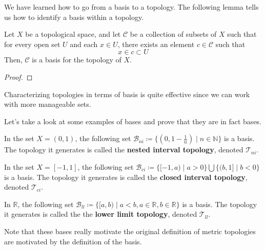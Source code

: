     We have learned how to go from a basis to a topology. The following lemma tells us how to identify a basis within a topology. 

    \begin{theorem}
      Let $X$ be a topological space, and let $\mathcal{C}$ be a collection of subsets of $X$ such that for every open set $U$ and each $x \in U$, there exists an element $c \in \mathcal{C}$ such that
      \begin{equation}
        x \in c \subset U
      \end{equation}
      Then, $\mathcal{C}$ is a basis for the topology of $X$. 
    \end{theorem}
    \begin{proof}
      
    \end{proof} 

    Characterizing topologies in terms of basis is quite effective since we can work with more manageable sets. 

    Let's take a look at some examples of bases and prove that they are in fact bases. 

    \begin{theorem}
      In the set $X = (0,1)$, the following set $\mathscr{B}_{ni} \coloneqq \{ (0, 1-\frac{1}{n}) \; | \; n \in \mathbb{N} \}$ is a basis. The topology it generates is called the \textbf{nested interval topology}, denoted $\mathscr{T}_{ni}$. 
    \end{theorem}

    \begin{theorem}[Closed Interval Topology on $[-1, 1\rbrack$]
      In the set $X = [-1, 1]$, the following set $\mathscr{B}_{ci} \coloneqq \{ [-1, a) \; | \; a>0 \big\} \bigcup \big\{ (b, 1] \; | \; b<0 \}$ is a basis. The topology it generates is called the \textbf{closed interval topology}, denoted $\mathscr{T}_{ci}$. 
    \end{theorem}

    \begin{theorem} 
      In $\mathbb{R}$, the following set $\mathscr{B}_{ll} \coloneqq \{ [a, b) \mid a < b, a \in \mathbb{R}, b \in \mathbb{R} \}$ is a basis. The topology it generates is called the the \textbf{lower limit topology}, denoted $\mathscr{T}_{ll}$. 
    \end{theorem} 

    Note that these bases really motivate the original definition of metric topologies are motivated by the definition of the basis.  

